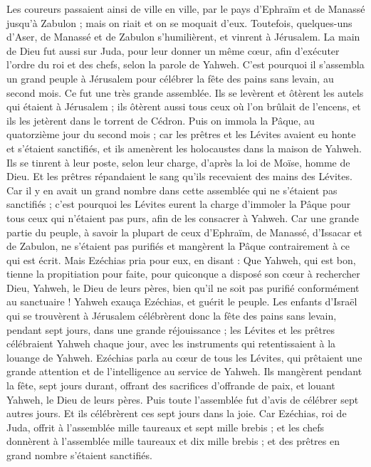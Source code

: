 \begin{multicols}{2}
Les coureurs passaient ainsi de ville en ville, par le pays d'Ephraïm et de Manassé jusqu'à Zabulon ; mais on riait et on se moquait d'eux.
Toutefois, quelques-uns d'Aser, de Manassé et de Zabulon s'humilièrent, et vinrent à Jérusalem.
La main de Dieu fut aussi sur Juda, pour leur donner un même cœur, afin d'exécuter l'ordre du roi et des chefs, selon la parole de Yahweh.
C'est pourquoi il s'assembla un grand peuple à Jérusalem pour célébrer la fête des pains sans levain, au second mois. Ce fut une très grande assemblée.
Ils se levèrent et ôtèrent les autels qui étaient à Jérusalem ; ils ôtèrent aussi tous ceux où l'on brûlait de l'encens, et ils les jetèrent dans le torrent de Cédron.
Puis on immola la Pâque, au quatorzième jour du second mois ; car les prêtres et les Lévites avaient eu honte et s'étaient sanctifiés, et ils amenèrent les holocaustes dans la maison de Yahweh.
Ils se tinrent à leur poste, selon leur charge, d'après la loi de Moïse, homme de Dieu. Et les prêtres répandaient le sang qu'ils recevaient des mains des Lévites.
Car il y en avait un grand nombre dans cette assemblée qui ne s'étaient pas sanctifiés ; c'est pourquoi les Lévites eurent la charge d'immoler la Pâque pour tous ceux qui n'étaient pas purs, afin de les consacrer à Yahweh.
Car une grande partie du peuple, à savoir la plupart de ceux d'Ephraïm, de Manassé, d'Issacar et de Zabulon, ne s'étaient pas purifiés et mangèrent la Pâque contrairement à ce qui est écrit. Mais Ezéchias pria pour eux, en disant : Que Yahweh, qui est bon, tienne la propitiation pour faite,
pour quiconque a disposé son cœur à rechercher Dieu, Yahweh, le Dieu de leurs pères, bien qu'il ne soit pas purifié conformément au sanctuaire !
Yahweh exauça Ezéchias, et guérit le peuple.
Les enfants d'Israël qui se trouvèrent à Jérusalem célébrèrent donc la fête des pains sans levain, pendant sept jours, dans une grande réjouissance ; les Lévites et les prêtres célébraient Yahweh chaque jour, avec les instruments qui retentissaient à la louange de Yahweh.
Ezéchias parla au cœur de tous les Lévites, qui prêtaient une grande attention et de l'intelligence au service de Yahweh. Ils mangèrent pendant la fête, sept jours durant, offrant des sacrifices d'offrande de paix, et louant Yahweh, le Dieu de leurs pères.
Puis toute l'assemblée fut d'avis de célébrer sept autres jours. Et ils célébrèrent ces sept jours dans la joie.
Car Ezéchias, roi de Juda, offrit à l'assemblée mille taureaux et sept mille brebis ; et les chefs donnèrent à l'assemblée mille taureaux et dix mille brebis ; et des prêtres en grand nombre s'étaient sanctifiés.

\end{multicols}
